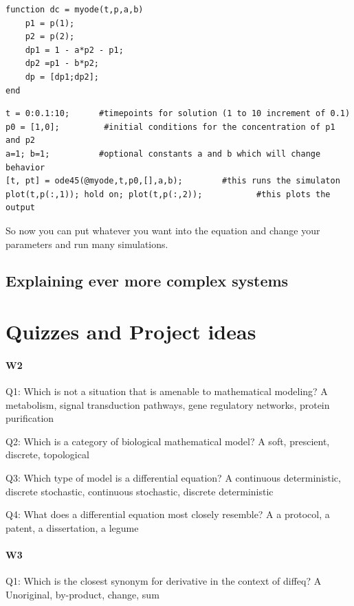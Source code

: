 \begin{verbatim}
function dc = myode(t,p,a,b)
    p1 = p(1);
    p2 = p(2);
    dp1 = 1 - a*p2 - p1;
    dp2 =p1 - b*p2;
    dp = [dp1;dp2];
end
\end{verbatim}

\begin{verbatim}
t = 0:0.1:10;      #timepoints for solution (1 to 10 increment of 0.1)
p0 = [1,0];         #initial conditions for the concentration of p1 and p2
a=1; b=1;          #optional constants a and b which will change behavior
[t, pt] = ode45(@myode,t,p0,[],a,b);        #this runs the simulaton 
plot(t,p(:,1)); hold on; plot(t,p(:,2));           #this plots the output
\end{verbatim}

So now you can put whatever you want into the equation and change your parameters and run many simulations.  

% 



\subsection{Explaining ever more complex systems}

% 


\section{Quizzes and Project ideas}
\paragraph{W2}
Q1: Which is not a situation that is amenable to mathematical modeling?
A metabolism, signal transduction pathways, gene regulatory networks, protein purification

Q2: Which is a category of biological mathematical model?
A soft, prescient, discrete, topological

Q3: Which type of model is a differential equation?
A continuous deterministic, discrete stochastic, continuous stochastic, discrete deterministic

Q4: What does a differential equation most closely resemble?
A a protocol, a patent, a dissertation, a legume


\paragraph{W3}
Q1: Which is the closest synonym for derivative in the context of diffeq?
A Unoriginal, by-product, change, sum


